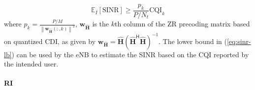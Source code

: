 \documentclass[a4paper,12pt]{article}%
\newcommand{\norm}[1]{\left\lVert#1\right\rVert} %
\begin{document}
\begin{itemize}
\begin{equation}\label{eq:sinr-lb}
\mathbb{E}_I[\text{SINR}] \geq \frac{p_k}{P/N_t}\text{CQI}_k
\end{equation}
where $p_k=\frac{P/M}{\norm{\mathbf{w}_{\hat{\mathbf{H}}}(:,k)}^2}$, $\mathbf{w}_{\hat{\mathbf{H}}}$ is the $k$th column of the ZR precoding matrix based on quantized CDI, as given by $\mathbf{w}_{\hat{\mathbf{H}}}=\hat{\mathbf{H}}(\hat{\mathbf{H}}^\mathsf{H} \hat{\mathbf{H}})^{-1}$. The lower bound in (\ref{eq:sinr-lb}) can be used by the eNB to estimate the SINR based on the CQI reported by the intended user.
\end{itemize}

\paragraph{RI}
\end{document}
